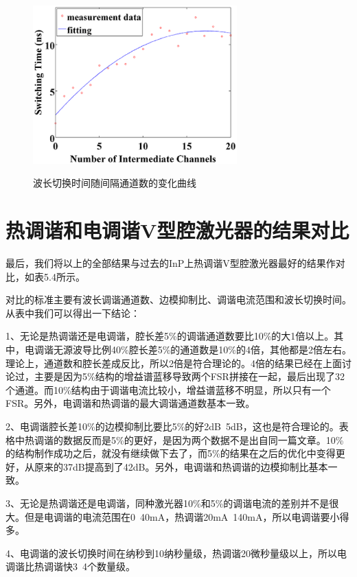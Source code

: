 \documentclass{ZJUthesis}
\begin{document}
\begin{figure}[!ht]
  \centering
  \includegraphics[width=0.7\textwidth]{./Pictures/switch4.eps}\\
  \caption{波长切换时间随间隔通道数的变化曲线}
  \label{fig_switch4}
\end{figure}

\section{热调谐和电调谐V型腔激光器的结果对比}

最后，我们将以上的全部结果与过去的InP上热调谐V型腔激光器最好的结果作对比，如表5.4所示。

对比的标准主要有波长调谐通道数、边模抑制比、调谐电流范围和波长切换时间。从表中我们可以得出一下结论：

1、无论是热调谐还是电调谐，腔长差5\%的调谐通道数要比10\%的大1倍以上。其中，电调谐无源波导比例40\%腔长差5\%的通道数是10\%的4倍，其他都是2倍左右。理论上，通道数和腔长差成反比，所以2倍是符合理论的。4倍的结果已经在上面讨论过，主要是因为5\%结构的增益谱蓝移导致两个FSR拼接在一起，最后出现了32个通道。而10\%结构由于调谐电流比较小，增益谱蓝移不明显，所以只有一个FSR。另外，电调谐和热调谐的最大调谐通道数基本一致。

2、电调谐腔长差10\%的边模抑制比要比5\%的好2dB~5dB，这也是符合理论的。表格中热调谐的数据反而是5\%的更好，是因为两个数据不是出自同一篇文章。10\%的结构制作成功之后，就没有继续做下去了，而5\%的结果在之后的优化中变得更好，从原来的37dB提高到了42dB。另外，电调谐和热调谐的边模抑制比基本一致。

3、无论是热调谐还是电调谐，同种激光器10\%和5\%的调谐电流的差别并不是很大。但是电调谐的电流范围在0~40mA，热调谐20mA~140mA，所以电调谐要小得多。

4、电调谐的波长切换时间在纳秒到10纳秒量级，热调谐20微秒量级以上，所以电调谐比热调谐快3~4个数量级。
\end{document}
